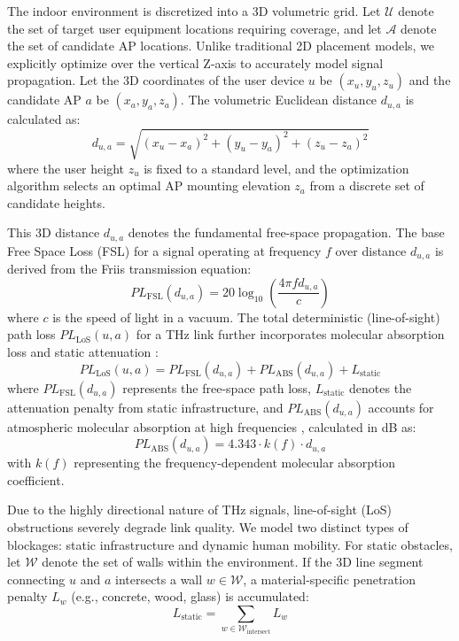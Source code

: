 \documentclass[conference]{IEEEtran}
\begin{document}
The indoor environment is discretized into a 3D volumetric grid. Let $\mathcal{U}$ denote the set of target user equipment locations requiring coverage, and let $\mathcal{A}$ denote the set of candidate AP locations. Unlike traditional 2D placement models, we explicitly optimize over the vertical Z-axis to accurately model signal propagation. Let the 3D coordinates of the user device $u$ be $(x_u, y_u, z_u)$ and the candidate AP $a$ be $(x_a, y_a, z_a)$. The volumetric Euclidean distance $d_{u,a}$ is calculated as:
\begin{equation}
    d_{u,a} = \sqrt{(x_u - x_a)^2 + (y_u - y_a)^2 + (z_u - z_a)^2}
    \label{eq:3d_distance}
\end{equation}
where the user height $z_u$ is fixed to a standard level, and the optimization algorithm selects an optimal AP mounting elevation $z_a$ from a discrete set of candidate heights. 

This 3D distance $d_{u,a}$ denotes the fundamental free-space propagation. The base Free Space Loss (FSL) for a signal operating at frequency $f$ over distance $d_{u,a}$ is derived from the Friis transmission equation:
\begin{equation}
    PL_{\text{FSL}}(d_{u,a}) = 20\log_{10}\left(\frac{4\pi f d_{u,a}}{c}\right)
\end{equation}
where $c$ is the speed of light in a vacuum. The total deterministic (line-of-sight) path loss $PL_{\text{LoS}}(u,a)$ for a THz link further incorporates molecular absorption loss and static attenuation \cite{b1}:
\begin{equation}
    PL_{\text{LoS}}(u,a) = PL_{\text{FSL}}(d_{u,a}) + PL_{\text{ABS}}(d_{u,a}) + L_{\text{static}}
    \label{eq:total_pl}
\end{equation}
where $PL_{\text{FSL}}(d_{u,a})$ represents the free-space path loss, $L_{\text{static}}$ denotes the attenuation penalty from static infrastructure, and $PL_{\text{ABS}}(d_{u,a})$ accounts for atmospheric molecular absorption at high frequencies \cite{b2}, calculated in dB as:
\begin{equation}
    PL_{\text{ABS}}(d_{u,a}) = 4.343 \cdot k(f) \cdot d_{u,a}
\end{equation}
with $k(f)$ representing the frequency-dependent molecular absorption coefficient.

Due to the highly directional nature of THz signals, line-of-sight (LoS) obstructions severely degrade link quality. We model two distinct types of blockages: static infrastructure and dynamic human mobility. For static obstacles, let $\mathcal{W}$ denote the set of walls within the environment. If the 3D line segment connecting $u$ and $a$ intersects a wall $w \in \mathcal{W}$, a material-specific penetration penalty $L_{w}$ (e.g., concrete, wood, glass) is accumulated:
\begin{equation}
    L_{\text{static}} = \sum_{w \in \mathcal{W}_{\text{intersect}}} L_{w}
\end{equation}
\end{document}
